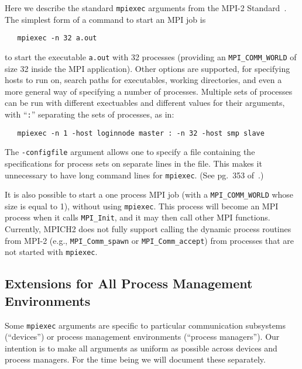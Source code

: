 \documentclass[dvipdfm,11pt]{article}
\begin{document}
Here we describe the standard \texttt{mpiexec} arguments from the MPI-2
Standard~\cite{mpi-forum:mpi2-journal}.  The simplest form of a command
to start an MPI job is 
\begin{verbatim}
   mpiexec -n 32 a.out
\end{verbatim}
to start the executable \texttt{a.out} with 32 processes (providing an
\texttt{MPI\_COMM\_WORLD} of size 32 inside the MPI application).  Other
options are supported, for specifying hosts to run on,  search paths for
executables, working directories, and even a more general way of
specifying a number of processes.  Multiple sets of processes can be run
with different exectuables and different values for their arguments,
with ``\texttt{:}'' separating the sets of processes, as in:
\begin{verbatim}
   mpiexec -n 1 -host loginnode master : -n 32 -host smp slave
\end{verbatim}
The \texttt{-configfile} argument allows one to specify a file containing the
specifications for process sets on separate lines in the file.  This
makes it unnecessary to have long command lines for \texttt{mpiexec}.  
(See pg.~353 of~\cite{Snir:1998:MPI2Book}.)

It is also possible to start a one process MPI job (with a
\texttt{MPI\_COMM\_WORLD} whose size is equal to 1), without using
\texttt{mpiexec}. 
This process will become an MPI process when it calls \texttt{MPI\_Init}, and
it may then call other MPI functions.  
Currently, MPICH2 does not fully support calling the dynamic process routines
from MPI-2 (e.g., \texttt{MPI\_Comm\_spawn} or \texttt{MPI\_Comm\_accept})
from processes that are not started with \texttt{mpiexec}.  

\subsection{Extensions for All Process Management Environments}
\label{sec:extensions-uniform}

Some \texttt{mpiexec} arguments are specific to particular communication
subsystems (``devices'') or process management environments (``process
managers'').  Our intention is to make all arguments as uniform as
possible across devices and process managers.  For the time being we
will document these separately.
\end{document}
